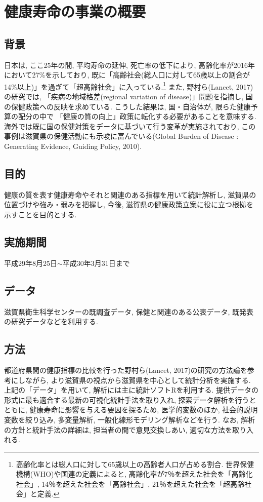 
\chapter{健康寿命の事業の概要}
\section{背景}
日本は, ここ25年の間, 平均寿命の延伸, 死亡率の低下により, 高齢化率が2016年において27\%を示しており, 既に「高齢社会(総人口に対して65歳以上の割合が14\%以上)」を過ぎて「超高齢社会」に入っている.\footnote{
	高齢化率とは総人口に対して65歳以上の高齢者人口が占める割合. 世界保健機構(WHO)や国連の定義によると, 高齢化率が7％を超えた社会を「高齢化社会」, 14％を超えた社会を「高齢社会」, 21％を超えた社会を「超高齢社会」と定義.
}
また, 野村ら(Lancet, 2017)の研究では, 「疾病の地域格差(regional variation of disease)」問題を指摘し, 国の保健政策への反映を求めている. こうした結果は, 国・自治体が, 限らた健康予算の配分の中で 「健康の質の向上」政策に転化する必要があることを意味する. 海外では既に国の保健対策をデータに基づいて行う変革が実施されており, この事例は滋賀県の保健活動にも示唆に富んでいる(Global Burden of Disease :  Generating Evidence, Guiding Policy, 2010).
\section{目的}
健康の質を表す健康寿命やそれと関連のある指標を用いて統計解析し, 滋賀県の位置づけや強み・弱みを把握し, 今後, 滋賀県の健康政策立案に役に立つ根拠を示すことを目的とする.
\section{実施期間}
平成29年8月25日$\sim$平成30年3月31日まで

\section{データ}
滋賀県衛生科学センターの既調査データ, 保健と関連のある公表データ, 既発表の研究データなどを利用する.

\section{方法}
都道府県間の健康指標の比較を行った野村ら(Lancet, 2017)の研究の方法論を参考にしながら, より滋賀県の視点から滋賀県を中心として統計分析を実施する. 上記の「データ」を用いて, 解析には主に統計ソフトRを利用する. 提供データの形式に最も適合する最新の可視化統計手法を取り入れ, 探索データ解析を行うとともに, 健康寿命に影響を与える要因を探るため,  医学的変数のほか, 社会的説明変数を絞り込み, 多変量解析, 一般化線形モデリング解析などを行う. なお, 解析の方針と統計手法の詳細は, 担当者の間で意見交換しあい, 適切な方法を取り入れる.


